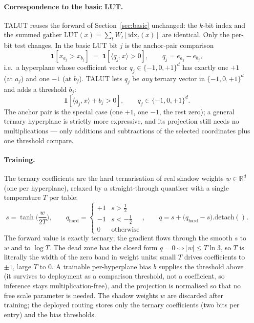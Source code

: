 \documentclass[11pt]{article}
\begin{document}
\paragraph{Correspondence to the basic LUT.} TALUT reuses the forward of
Section~\ref{sec:basic} unchanged: the $k$-bit index and the summed gather
$\mathrm{LUT}(x)=\sum_t W_t[\mathrm{idx}_t(x)]$ are identical. Only the per-bit test changes. In the
basic LUT bit $j$ is the anchor-pair comparison
\begin{equation}
\mathbf{1}\!\left[x_{a_{j}}>x_{b_{j}}\right]
\;=\;\mathbf{1}\!\left[\langle q_{j},x\rangle>0\right],\qquad q_{j}=e_{a_{j}}-e_{b_{j}},
\end{equation}
i.e.\ a hyperplane whose coefficient vector $q_{j}\in\{-1,0,+1\}^{d}$ has exactly one $+1$
(at $a_{j}$) and one $-1$ (at $b_{j}$). TALUT lets $q_{j}$ be \emph{any} ternary vector in
$\{-1,0,+1\}^{d}$ and adds a threshold $b_{j}$:
\begin{equation}
\mathbf{1}\!\left[\langle q_{j},x\rangle+b_{j}>0\right],\qquad q_{j}\in\{-1,0,+1\}^{d}.
\end{equation}
The anchor pair is the special case (one $+1$, one $-1$, the rest zero); a general ternary
hyperplane is strictly more expressive, and its projection still needs no multiplications ---
only additions and subtractions of the selected coordinates plus one threshold compare.

\paragraph{Training.} The ternary coefficients are the hard ternarisation of real shadow
weights $w\in\mathbb{R}^{d}$ (one per hyperplane), relaxed by a straight-through quantiser
with a single temperature $T$ per table:
\begin{equation}
s=\tanh\!\Big(\frac{w}{2T}\Big),\qquad
q_{\mathrm{hard}}=\begin{cases}+1 & s>\tfrac12\\ -1 & s<-\tfrac12\\ 0 & \text{otherwise}\end{cases},\qquad
q=s+\big(q_{\mathrm{hard}}-s\big).\mathrm{detach()} .
\end{equation}
The forward value is exactly ternary; the gradient flows through the smooth $s$ to $w$ and to
$\log T$. The dead zone has the closed form $q=0\Leftrightarrow|w|\le T\ln 3$, so $T$ is
literally the width of the zero band in weight units: small $T$ drives coefficients to
$\pm1$, large $T$ to $0$. A trainable per-hyperplane bias $b$ supplies the threshold above
(it survives to deployment as a comparison threshold, not a coefficient, so inference stays
multiplication-free), and the projection is normalised so that no free scale parameter is
needed. The shadow weights $w$ are discarded after training; the deployed routing stores only
the ternary coefficients (two bits per entry) and the bias thresholds.
\end{document}
